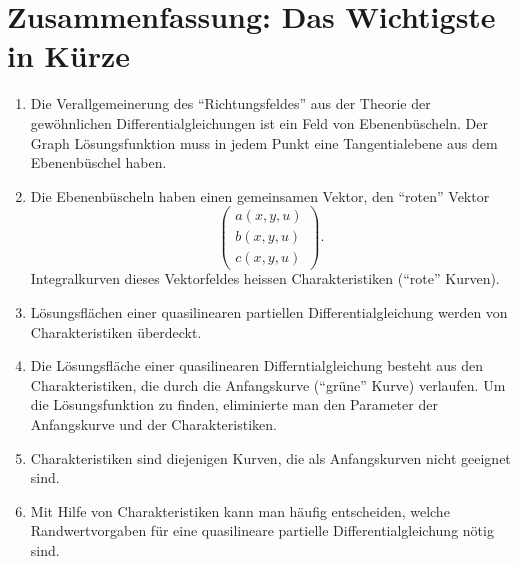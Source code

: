 \section{Zusammenfassung: Das Wichtigste in Kürze}
\begin{enumerate}
\item Die Verallgemeinerung des ``Richtungsfeldes'' aus der Theorie der
gewöhnlichen Differentialgleichungen ist ein Feld von Ebenenbüscheln.
Der Graph Lösungsfunktion muss in jedem Punkt eine Tangentialebene aus
dem Ebenenbüschel haben.
\item Die Ebenenbüscheln haben einen gemeinsamen Vektor, den ``roten''
Vektor
\[
\begin{pmatrix}
a(x,y,u)\\
b(x,y,u)\\
c(x,y,u)
\end{pmatrix}.
\]
Integralkurven dieses Vektorfeldes heissen Charakteristiken (``rote'' Kurven).
\item Lösungsflächen einer quasilinearen partiellen Differentialgleichung
werden von Charakteristiken überdeckt.
\item Die Lösungsfläche einer quasilinearen Differntialgleichung besteht aus
den Charakteristiken, die durch die Anfangskurve
(``grüne'' Kurve) verlaufen.
Um die Lösungsfunktion zu finden, eliminierte man den Parameter der
Anfangskurve und der Charakteristiken.
\item Charakteristiken sind diejenigen Kurven, die als Anfangskurven
nicht geeignet sind.
\item Mit Hilfe von Charakteristiken kann man häufig entscheiden,
welche Randwertvorgaben für eine quasilineare partielle Differentialgleichung
nötig sind.
\end{enumerate}
